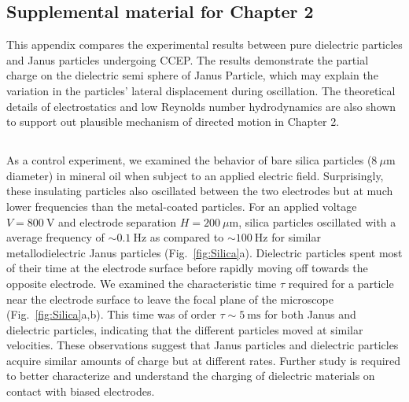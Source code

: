 \begin{appendices}



\chapter{Supplemental material for Chapter 2}
This appendix compares the experimental results between pure dielectric particles and  Janus particles undergoing CCEP. The results demonstrate the partial charge on the dielectric semi sphere of Janus Particle, which may explain the variation in the particles’ lateral displacement during oscillation. The theoretical details of electrostatics and low Reynolds number hydrodynamics are also shown to support out plausible mechanism of directed motion in Chapter 2.  


\section{}


\subsection{} \label{sec:Dielectric}

As a control experiment, we examined the behavior of bare silica particles ($8~\mu\text{m}$ diameter) in mineral oil when subject to an applied electric field.
Surprisingly, these insulating particles also oscillated between the two electrodes but at much lower frequencies than the metal-coated particles.
For an applied voltage $V=800~\text{V}$ and electrode separation $H=200~\mu\text{m}$, silica particles oscillated with a average frequency of ${\sim}0.1~\text{Hz}$ as compared to ${\sim}100~\text{Hz}$ for similar metallodielectric Janus particles (Fig.~\ref{fig:Silica}a). 
Dielectric particles spent most of their time at the electrode surface before rapidly moving off towards the opposite electrode.
We examined the characteristic time $\tau$ required for a particle near the electrode surface to leave the focal plane of the microscope (Fig.~\ref{fig:Silica}a,b).
This time was of order $\tau\sim 5~\text{ms}$ for both Janus and dielectric particles, indicating that the different particles moved at similar velocities.
These observations suggest that Janus particles and dielectric particles acquire similar amounts of charge but at different rates.
Further study is required to better characterize and understand the charging of dielectric materials on contact with biased electrodes.


\end{appendices}
